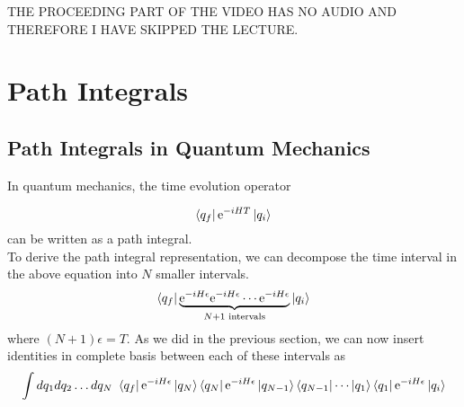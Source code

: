 \documentclass[11pt]{article}
\newcommand{\e}{\mathrm{e}}
\numberwithin{equation}{section}
\begin{document}
THE PROCEEDING PART OF THE VIDEO HAS NO AUDIO AND THEREFORE I HAVE SKIPPED THE LECTURE.

\newpage
\section{Path Integrals}
\subsection{Path Integrals in Quantum Mechanics}
In quantum mechanics, the time evolution operator

\begin{equation*}
    \bra{q_f} \e^{-iHT}\ket{q_i}
\end{equation*}
can be written as a path integral.\\

To derive the path integral representation, we can decompose the time interval in the above equation into \(N\) smaller intervals.
\begin{equation*}
    \bra{q_f} \underbrace{\e^{-iH\epsilon}\e^{-iH\epsilon}\cdots \e^{-iH\epsilon}}_{N+1 \text{ intervals}}\ket{q_i}
\end{equation*}
where \((N+1)\epsilon = T\). As we did in the previous section, we can now insert identities in complete basis between each of these intervals as 
\begin{equation*}
    \int dq_1 dq_2 \ldots dq_N~\bra{q_f} \e^{-iH\epsilon}\ket{q_N} \bra{q_N}\e^{-iH\epsilon}\ket{q_{N-1}} \bra{q_{N-1}}\cdots \ket{q_1} \bra{q_1}\e^{-iH\epsilon}\ket{q_i}
\end{equation*}
\end{document}
